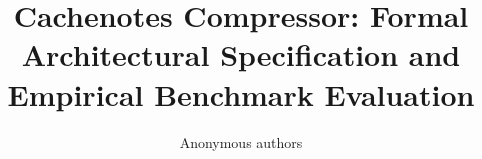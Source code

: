 \title{\textbf{Cachenotes Compressor: Formal Architectural Specification and Empirical Benchmark Evaluation}}

\author{Anonymous authors}
